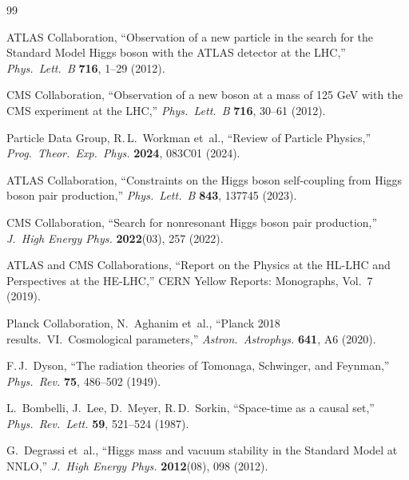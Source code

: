 \documentclass[12pt,a4paper]{article}
\begin{document}
\begin{thebibliography}{99}

ATLAS Collaboration, ``Observation of a new particle in the search for the Standard Model Higgs boson with the ATLAS detector at the LHC,'' \textit{Phys.\ Lett.\ B} \textbf{716}, 1--29 (2012).

CMS Collaboration, ``Observation of a new boson at a mass of 125 GeV with the CMS experiment at the LHC,'' \textit{Phys.\ Lett.\ B} \textbf{716}, 30--61 (2012).

Particle Data Group, R.\,L.\ Workman et~al., ``Review of Particle Physics,'' \textit{Prog.\ Theor.\ Exp.\ Phys.} \textbf{2024}, 083C01 (2024).

ATLAS Collaboration, ``Constraints on the Higgs boson self-coupling from Higgs boson pair production,'' \textit{Phys.\ Lett.\ B} \textbf{843}, 137745 (2023).

CMS Collaboration, ``Search for nonresonant Higgs boson pair production,'' \textit{J.\ High Energy Phys.} \textbf{2022}(03), 257 (2022).

ATLAS and CMS Collaborations, ``Report on the Physics at the HL-LHC and Perspectives at the HE-LHC,'' CERN Yellow Reports: Monographs, Vol.\ 7 (2019).

Planck Collaboration, N.\ Aghanim et~al., ``Planck 2018 results.\ VI.\ Cosmological parameters,'' \textit{Astron.\ Astrophys.} \textbf{641}, A6 (2020).


F.\,J.\ Dyson, ``The radiation theories of Tomonaga, Schwinger, and Feynman,'' \textit{Phys.\ Rev.} \textbf{75}, 486--502 (1949).

L.\ Bombelli, J.\ Lee, D.\ Meyer, R.\,D.\ Sorkin, ``Space-time as a causal set,'' \textit{Phys.\ Rev.\ Lett.} \textbf{59}, 521--524 (1987).

G.\ Degrassi et~al., ``Higgs mass and vacuum stability in the Standard Model at NNLO,'' \textit{J.\ High Energy Phys.} \textbf{2012}(08), 098 (2012).


\end{thebibliography}
\end{document}
